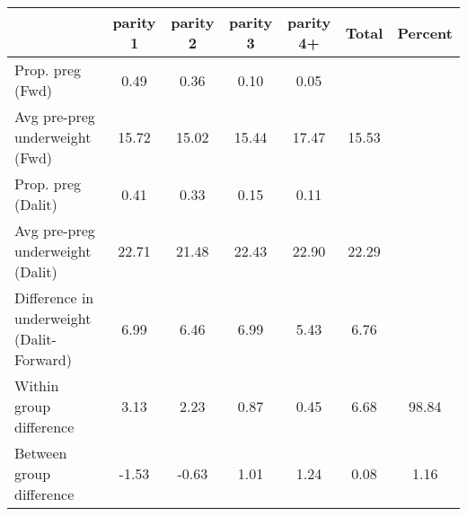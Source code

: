 \begin{tabular}{l*{6}{c}}
\toprule
            &\multicolumn{1}{c}{parity 1}&\multicolumn{1}{c}{parity 2}&\multicolumn{1}{c}{parity 3}&\multicolumn{1}{c}{parity 4+}&\multicolumn{1}{c}{Total}&\multicolumn{1}{c}{Percent}\\
\midrule
\midrule
Prop. preg (Fwd)&        0.49&        0.36&        0.10&        0.05&            &            \\
Avg pre-preg underweight (Fwd)&       15.72&       15.02&       15.44&       17.47&       15.53&            \\
Prop. preg (Dalit)&        0.41&        0.33&        0.15&        0.11&            &            \\
Avg pre-preg underweight (Dalit)&       22.71&       21.48&       22.43&       22.90&       22.29&            \\
Difference in underweight (Dalit-Forward)&        6.99&        6.46&        6.99&        5.43&        6.76&            \\
Within group difference&        3.13&        2.23&        0.87&        0.45&        6.68&       98.84\\
Between group difference&       -1.53&       -0.63&        1.01&        1.24&        0.08&        1.16\\
\bottomrule
\end{tabular}
